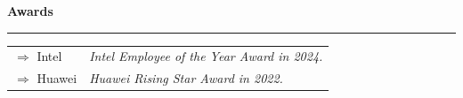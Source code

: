 \documentclass[a4paper,12pt,final]{memoir}
\newcommand{\SmallSep}{\vspace{0.9em}}
\newcommand{\CVSection}[1]
	{\Large\textbf{#1}\par
	\vspace{0.2cm}\normalsize\normalfont}
\begin{document}
\CVSection{Awards}
\hrule
\SmallSep
	\begin{tabular}{l|l}
		$\Rightarrow$ Intel &\textit{ Intel Employee of the Year Award in 2024.}\footnotesize\\
		$\Rightarrow$ Huawei&\textit{ Huawei Rising Star Award in 2022.}\\
	\end{tabular}

\end{document}
